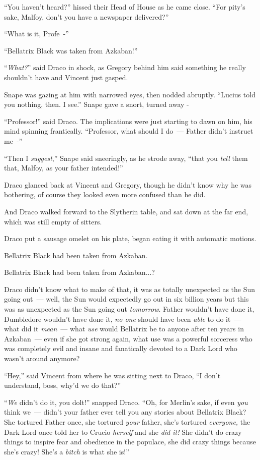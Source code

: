 ``You haven't heard?'' hissed their Head of House as he came close. ``For pity's sake, Malfoy, don't you have a newspaper delivered?''

``What is it, Profe~-''

``Bellatrix Black was taken from Azkaban!''

``\emph{What?}'' said Draco in shock, as Gregory behind him said something he really shouldn't have and Vincent just gasped.

Snape was gazing at him with narrowed eyes, then nodded abruptly. ``Lucius told you nothing, then. I see.'' Snape gave a snort, turned away -

``Professor!'' said Draco. The implications were just starting to dawn on him, his mind spinning frantically. ``Professor, what should I do~--- Father didn't instruct me~-''

``Then I \emph{suggest},'' Snape said sneeringly, as he strode away, ``that you \emph{tell} them that, Malfoy, as your father intended!''

Draco glanced back at Vincent and Gregory, though he didn't know why he was bothering, of course they looked even more confused than he did.

And Draco walked forward to the Slytherin table, and sat down at the far end, which was still empty of sitters.

Draco put a sausage omelet on his plate, began eating it with automatic motions.

Bellatrix Black had been taken from Azkaban.

Bellatrix Black had been taken from Azkaban...?

Draco didn't know what to make of that, it was as totally unexpected as the Sun going out~--- well, the Sun would expectedly go out in six billion years but this was as unexpected as the Sun going out \emph{tomorrow}. Father wouldn't have done it, Dumbledore wouldn't have done it, \emph{no one} should have been \emph{able} to do it~--- what did it \emph{mean}~--- what \emph{use} would Bellatrix be to anyone after ten years in Azkaban~--- even if she got strong again, what use was a powerful sorceress who was completely evil and insane and fanatically devoted to a Dark Lord who wasn't around anymore?

``Hey,'' said Vincent from where he was sitting next to Draco, ``I don't understand, boss, why'd we do that?''

``\emph{We} didn't do it, you dolt!'' snapped Draco. ``Oh, for Merlin's sake, if even \emph{you} think we~--- didn't your father ever tell you any stories about Bellatrix Black? She tortured Father once, she tortured \emph{your} father, she's tortured \emph{everyone,} the Dark Lord once told her to Crucio \emph{herself} and she \emph{did it!} She didn't do crazy things to inspire fear and obedience in the populace, she did crazy things because she's crazy! She's a \emph{bitch} is what she is!''

